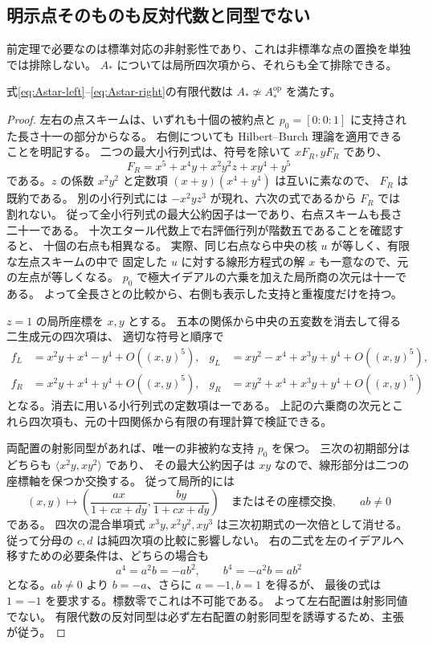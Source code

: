 \subsection{明示点そのものも反対代数と同型でない}

前定理で必要なのは標準対応の非射影性であり、これは非標準な点の置換を単独では排除しない。
$A_*$ については局所四次項から、それらも全て排除できる。

\begin{proposition}
\label{prop:Astar-not-self-opposite-v23}
式\eqref{eq:Astar-left}--\eqref{eq:Astar-right}の有限代数は
$A_*\not\simeq A_*^{\mathrm{op}}$ を満たす。
\end{proposition}
\begin{proof}
左右の点スキームは、いずれも十個の被約点と
$p_0=[0:0:1]$ に支持された長さ十一の部分からなる。
右側についても Hilbert--Burch 理論を適用できることを明記する。
二つの最大小行列式は、符号を除いて $xF_R,yF_R$ であり、
\[
 F_R=x^5+x^4y+x^2y^2z+xy^4+y^5
\]
である。$z$ の係数 $x^2y^2$ と定数項 $(x+y)(x^4+y^4)$ は互いに素なので、
$F_R$ は既約である。
別の小行列式には $-x^2yz^3$ が現れ、六次の式であるから $F_R$ では割れない。
従って全小行列式の最大公約因子は一であり、右点スキームも長さ二十一である。
十次エタール代数上で右評価行列が階数五であることを確認すると、
十個の右点も相異なる。
実際、同じ右点なら中央の核 $u$ が等しく、有限な左点スキームの中で
固定した $u$ に対する線形方程式の解 $x$ も一意なので、元の左点が等しくなる。
$p_0$ で極大イデアルの六乗を加えた局所商の次元は十一である。
よって全長さとの比較から、右側も表示した支持と重複度だけを持つ。

$z=1$ の局所座標を $x,y$ とする。
五本の関係から中央の五変数を消去して得る二生成元の四次項は、
適切な符号と順序で
\begin{align*}
 f_L&=x^2y+x^4-y^4+O((x,y)^5),&
 g_L&=xy^2-x^4+x^3y+y^4+O((x,y)^5),\\
 f_R&=x^2y+x^4+y^4+O((x,y)^5),&
 g_R&=xy^2+x^4+x^3y+y^4+O((x,y)^5)
\end{align*}
となる。消去に用いる小行列式の定数項は一である。
上記の六乗商の次元とこれら四次項も、元の十四関係から有限の有理計算で検証できる。

両配置の射影同型があれば、唯一の非被約な支持 $p_0$ を保つ。
三次の初期部分はどちらも $\langle x^2y,xy^2\rangle$ であり、
その最大公約因子は $xy$ なので、線形部分は二つの座標軸を保つか交換する。
従って局所的には
\[
 (x,y)\longmapsto
 \left(\frac{ax}{1+cx+dy},\frac{by}{1+cx+dy}\right)
 \quad\text{またはその座標交換},\qquad ab\ne0
\]
である。
四次の混合単項式 $x^3y,x^2y^2,xy^3$ は三次初期式の一次倍として消せる。
従って分母の $c,d$ は純四次項の比較に影響しない。
右の二式を左のイデアルへ移すための必要条件は、どちらの場合も
\[
 a^4=a^2b=-ab^2,\qquad b^4=-a^2b=ab^2
\]
となる。$ab\ne0$ より $b=-a$、さらに $a=-1,b=1$ を得るが、
最後の式は $1=-1$ を要求する。標数零でこれは不可能である。
よって左右配置は射影同値でない。
有限代数の反対同型は必ず左右配置の射影同型を誘導するため、主張が従う。
\end{proof}

